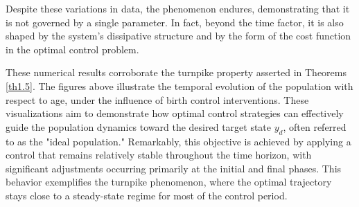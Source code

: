 \documentclass[10pt, a4]{amsart}
\theoremstyle{plain}
\theoremstyle{definition}
\theoremstyle{remark}
\numberwithin{equation}{section}
\begin{document}

Despite these variations in data, the phenomenon endures, demonstrating that it is not governed by a single parameter. In fact, beyond the time factor, it is also shaped by the system’s dissipative structure and by the form of the cost function in the optimal control problem.





   

These numerical results corroborate the turnpike property asserted in Theorems \ref{th1.5}.  The figures above illustrate the temporal evolution of the population with respect to age, under the influence of birth control interventions. These visualizations aim to demonstrate how optimal control strategies can effectively guide the population dynamics toward the desired target state $y_d$, often referred to as the "ideal population." Remarkably, this objective is achieved by applying a control that remains relatively stable throughout the time horizon, with significant adjustments occurring primarily at the initial and final phases. This behavior exemplifies the turnpike phenomenon, where the optimal trajectory stays close to a steady-state regime for most of the control period.
\end{document}
